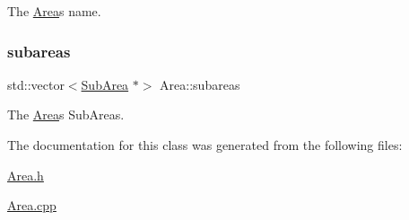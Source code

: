 The \mbox{\hyperlink{classArea}{Area}}\textquotesingle{}s name. 

\mbox{\label{classArea_af5eafd40b41ae847a009feef631ce07f}} 
\subsubsection{\texorpdfstring{subareas}{subareas}}
{\footnotesize\ttfamily std\+::vector$<$\mbox{\hyperlink{classSubArea}{Sub\+Area}} $\ast$$>$ Area\+::subareas\hspace{0.3cm}{\ttfamily [private]}}



The \mbox{\hyperlink{classArea}{Area}}\textquotesingle{}s Sub\+Areas. 



The documentation for this class was generated from the following files\+:\begin{DoxyCompactItemize}
\item 
\mbox{\hyperlink{Area_8h}{Area.\+h}}\item 
\mbox{\hyperlink{Area_8cpp}{Area.\+cpp}}\end{DoxyCompactItemize}
